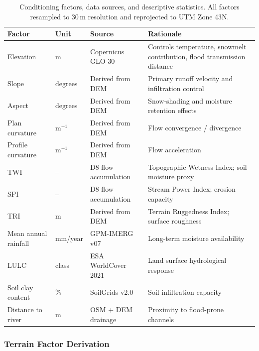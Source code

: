 \begin{table}[htbp]
  \centering
  \caption{Conditioning factors, data sources, and descriptive statistics.
    All factors resampled to 30\,m resolution and reprojected to UTM Zone 43N.}
  \label{tab:factors}
  \small
  \begin{tabularx}{\textwidth}{lllX}
    \toprule
    Factor & Unit & Source & Rationale \\
    \midrule
    Elevation              & m         & Copernicus GLO-30    & Controls temperature, snowmelt contribution, flood transmission distance \\
    Slope                  & degrees   & Derived from DEM     & Primary runoff velocity and infiltration control \\
    Aspect                 & degrees   & Derived from DEM     & Snow-shading and moisture retention effects \\
    Plan curvature         & m$^{-1}$  & Derived from DEM     & Flow convergence / divergence \\
    Profile curvature      & m$^{-1}$  & Derived from DEM     & Flow acceleration \\
    TWI                    & --        & D8 flow accumulation & Topographic Wetness Index; soil moisture proxy \\
    SPI                    & --        & D8 flow accumulation & Stream Power Index; erosion capacity \\
    TRI                    & m         & Derived from DEM     & Terrain Ruggedness Index; surface roughness \\
    Mean annual rainfall   & mm/year   & GPM-IMERG v07        & Long-term moisture availability \\
    LULC                   & class     & ESA WorldCover 2021  & Land surface hydrological response \\
    Soil clay content      & \%        & SoilGrids v2.0       & Soil infiltration capacity \\
    Distance to river      & m         & OSM + DEM drainage   & Proximity to flood-prone channels \\
    \bottomrule
  \end{tabularx}
\end{table}

\subsubsection{Terrain Factor Derivation}
\label{sec:terrain}

